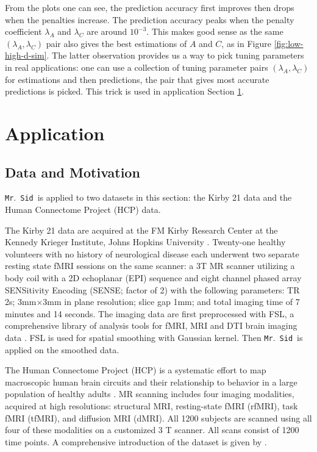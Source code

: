 \documentclass[fleqn,12pt]{article}
\let\oldref\ref
\renewcommand{\ref}[1]{(\oldref{#1})}
\newcommand{\mrsid}{{\sc \texttt{Mr}.~\texttt{Sid}}}
\begin{document}
From the plots one can see, the prediction accuracy first improves then drops when the penalties increase. The prediction accuracy peaks when the penalty coefficient $\lambda_A$ and $\lambda_C$ are around $10^{-3}$. This makes good sense as the same $(\lambda_A,\lambda_C)$ pair also gives the best estimations of $A$ and $C$, as in Figure \oldref{fig:low-high-d-sim}. The latter observation provides us a way to pick tuning parameters in real applications: one can use a collection of tuning parameter pairs $(\lambda_A,\lambda_C)$ for estimations and then predictions, the pair that gives most accurate predictions is picked. This trick is used in application Section \oldref{sec:application}.

\section{Application}
\label{sec:application}

\subsection{Data and Motivation}

\mrsid~is applied to two datasets in this section: the Kirby 21 data and the Human Connectome Project (HCP) data.

The Kirby 21 data are acquired at the FM Kirby Research Center at the Kennedy Krieger Institute, Johns Hopkins University \citep{landman2011multi}. Twenty-one healthy volunteers with no history of neurological disease each underwent two separate resting state fMRI sessions on the same scanner: a 3T MR scanner utilizing a body coil with a 2D echoplanar (EPI) sequence and eight channel phased array SENSitivity Encoding (SENSE; factor of 2) with the following parameters: TR 2s; 3mm$\times$3mm in plane resolution; slice gap 1mm; and total imaging time of 7 minutes and 14 seconds. The imaging data are first preprocessed with FSL, a comprehensive library of analysis tools for fMRI, MRI and DTI brain imaging data \citep{smith2004advances}. FSL is used for spatial smoothing with Gaussian kernel. Then \mrsid~is applied on the smoothed data.

The Human Connectome Project (HCP) is a systematic effort to map macroscopic human brain circuits and their relationship to behavior in a large population of healthy adults \citep{van2013wu,moeller2010multiband,feinberg2010multiplexed}. MR scanning includes four imaging modalities, acquired at high resolutions: structural MRI, resting-state fMRI (rfMRI), task fMRI (tfMRI), and diffusion MRI (dMRI). All 1200 subjects are scanned using all four of these modalities on a customized 3 T scanner.  All scans consist of 1200 time points. A comprehensive introduction of the dataset is given by \cite{van2013wu}.
\end{document}
